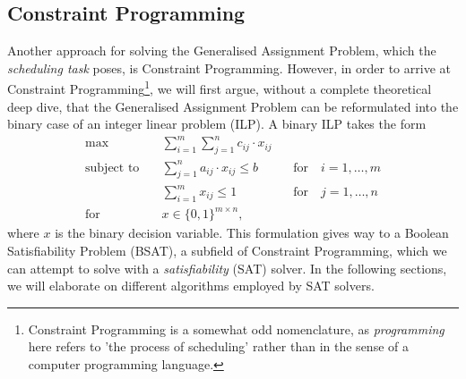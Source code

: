 \subsection{Constraint Programming}
Another approach for solving the Generalised Assignment Problem, which the \textit{scheduling task} poses, is Constraint Programming. However, in order to arrive at Constraint Programming\footnote{Constraint Programming is a somewhat odd nomenclature, as \textit{programming} here refers to 'the process of scheduling' rather than in the sense of a computer programming language.}, we will first argue, without a complete theoretical deep dive, that the Generalised Assignment Problem can be reformulated into the binary case of an integer linear problem (ILP). A binary ILP takes the form\cite{Integer-Programming-Book} 
\begin{align*}
    \text{max} \quad &\sum_{i = 1}^m \sum_{j = 1}^n c_{ij} \cdot x_{ij}
    \\
    \text{subject to} \quad &\sum_{j = 1}^n a_{ij} \cdot x_{ij} \leq b \qquad &\text{for} \quad i = 1, \hdots, m
    \\
    &\sum_{i = 1}^m x_{ij} \leq 1 \qquad &\text{for} \quad j = 1, \hdots, n
    \\
    \text{for} \quad &x \in \{0, 1\}^{m \times n},
\end{align*}
where $x$ is the binary decision variable. This formulation gives way to a Boolean Satisfiability Problem (BSAT), a subfield of Constraint Programming, which we can attempt to solve with a \textit{satisfiability} (SAT) solver. In the following sections, we will elaborate on different algorithms employed by SAT solvers.


